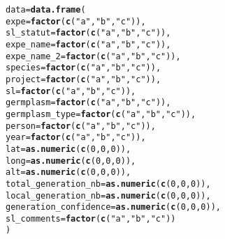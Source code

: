 \documentclass{article}\usepackage[]{graphicx}\usepackage[]{color}
\makeatletter
\newcommand{\hlnum}[1]{\textcolor[rgb]{0.686,0.059,0.569}{#1}}%
\newcommand{\hlstr}[1]{\textcolor[rgb]{0.192,0.494,0.8}{#1}}%
\newcommand{\hlstd}[1]{\textcolor[rgb]{0.345,0.345,0.345}{#1}}%
\newcommand{\hlkwb}[1]{\textcolor[rgb]{0.69,0.353,0.396}{#1}}%
\newcommand{\hlkwc}[1]{\textcolor[rgb]{0.333,0.667,0.333}{#1}}%
\newcommand{\hlkwd}[1]{\textcolor[rgb]{0.737,0.353,0.396}{\textbf{#1}}}%
\newenvironment{kframe}{%
 \def\at@end@of@kframe{}%
 \ifinner\ifhmode%
  \def\at@end@of@kframe{\end{minipage}}%
  \begin{minipage}{\columnwidth}%
 \fi\fi%
 \def\FrameCommand##1{\hskip\@totalleftmargin \hskip-\fboxsep
 \colorbox{shadecolor}{##1}\hskip-\fboxsep
     \hskip-\linewidth \hskip-\@totalleftmargin \hskip\columnwidth}%
 \MakeFramed {\advance\hsize-\width
   \@totalleftmargin\z@ \linewidth\hsize
   \@setminipage}}%
 {\par\unskip\endMakeFramed%
 \at@end@of@kframe}
\newenvironment{knitrout}{}{} %
\makeatother
\begin{document}
\begin{appendices}
\begin{knitrout}
\color{fgcolor}\begin{kframe}
\begin{alltt}
\hlstd{data} \hlkwb{=} \hlkwd{data.frame}\hlstd{(}
        \hlkwc{expe} \hlstd{=} \hlkwd{factor}\hlstd{(}\hlkwd{c}\hlstd{(}\hlstr{"a"}\hlstd{,} \hlstr{"b"}\hlstd{,} \hlstr{"c"}\hlstd{)),}
        \hlkwc{sl_statut} \hlstd{=} \hlkwd{factor}\hlstd{(}\hlkwd{c}\hlstd{(}\hlstr{"a"}\hlstd{,} \hlstr{"b"}\hlstd{,} \hlstr{"c"}\hlstd{)),}
        \hlkwc{expe_name} \hlstd{=} \hlkwd{factor}\hlstd{(}\hlkwd{c}\hlstd{(}\hlstr{"a"}\hlstd{,} \hlstr{"b"}\hlstd{,} \hlstr{"c"}\hlstd{)),}
        \hlkwc{expe_name_2} \hlstd{=} \hlkwd{factor}\hlstd{(}\hlkwd{c}\hlstd{(}\hlstr{"a"}\hlstd{,} \hlstr{"b"}\hlstd{,} \hlstr{"c"}\hlstd{)),}
        \hlkwc{species} \hlstd{=} \hlkwd{factor}\hlstd{(}\hlkwd{c}\hlstd{(}\hlstr{"a"}\hlstd{,} \hlstr{"b"}\hlstd{,} \hlstr{"c"}\hlstd{)),}
        \hlkwc{project} \hlstd{=} \hlkwd{factor}\hlstd{(}\hlkwd{c}\hlstd{(}\hlstr{"a"}\hlstd{,} \hlstr{"b"}\hlstd{,} \hlstr{"c"}\hlstd{)),}
        \hlkwc{sl} \hlstd{=} \hlkwd{factor}\hlstd{(}\hlkwd{c}\hlstd{(}\hlstr{"a"}\hlstd{,} \hlstr{"b"}\hlstd{,} \hlstr{"c"}\hlstd{)),}
        \hlkwc{germplasm} \hlstd{=} \hlkwd{factor}\hlstd{(}\hlkwd{c}\hlstd{(}\hlstr{"a"}\hlstd{,} \hlstr{"b"}\hlstd{,} \hlstr{"c"}\hlstd{)),}
        \hlkwc{germplasm_type} \hlstd{=} \hlkwd{factor}\hlstd{(}\hlkwd{c}\hlstd{(}\hlstr{"a"}\hlstd{,} \hlstr{"b"}\hlstd{,} \hlstr{"c"}\hlstd{)),}
        \hlkwc{person} \hlstd{=} \hlkwd{factor}\hlstd{(}\hlkwd{c}\hlstd{(}\hlstr{"a"}\hlstd{,} \hlstr{"b"}\hlstd{,} \hlstr{"c"}\hlstd{)),}
        \hlkwc{year} \hlstd{=} \hlkwd{factor}\hlstd{(}\hlkwd{c}\hlstd{(}\hlstr{"a"}\hlstd{,} \hlstr{"b"}\hlstd{,} \hlstr{"c"}\hlstd{)),}
        \hlkwc{lat} \hlstd{=} \hlkwd{as.numeric}\hlstd{(}\hlkwd{c}\hlstd{(}\hlnum{0}\hlstd{,} \hlnum{0}\hlstd{,} \hlnum{0}\hlstd{)),}
        \hlkwc{long} \hlstd{=} \hlkwd{as.numeric}\hlstd{(}\hlkwd{c}\hlstd{(}\hlnum{0}\hlstd{,} \hlnum{0}\hlstd{,} \hlnum{0}\hlstd{)),}
        \hlkwc{alt} \hlstd{=} \hlkwd{as.numeric}\hlstd{(}\hlkwd{c}\hlstd{(}\hlnum{0}\hlstd{,} \hlnum{0}\hlstd{,} \hlnum{0}\hlstd{)),}
        \hlkwc{total_generation_nb} \hlstd{=} \hlkwd{as.numeric}\hlstd{(}\hlkwd{c}\hlstd{(}\hlnum{0}\hlstd{,} \hlnum{0}\hlstd{,} \hlnum{0}\hlstd{)),}
        \hlkwc{local_generation_nb} \hlstd{=} \hlkwd{as.numeric}\hlstd{(}\hlkwd{c}\hlstd{(}\hlnum{0}\hlstd{,} \hlnum{0}\hlstd{,} \hlnum{0}\hlstd{)),}
        \hlkwc{generation_confidence} \hlstd{=} \hlkwd{as.numeric}\hlstd{(}\hlkwd{c}\hlstd{(}\hlnum{0}\hlstd{,} \hlnum{0}\hlstd{,} \hlnum{0}\hlstd{)),}
        \hlkwc{sl_comments} \hlstd{=} \hlkwd{factor}\hlstd{(}\hlkwd{c}\hlstd{(}\hlstr{"a"}\hlstd{,} \hlstr{"b"}\hlstd{,} \hlstr{"c"}\hlstd{))}
        \hlstd{)}


\end{alltt}
\end{kframe}
\end{knitrout}
\end{appendices}
\end{document}
